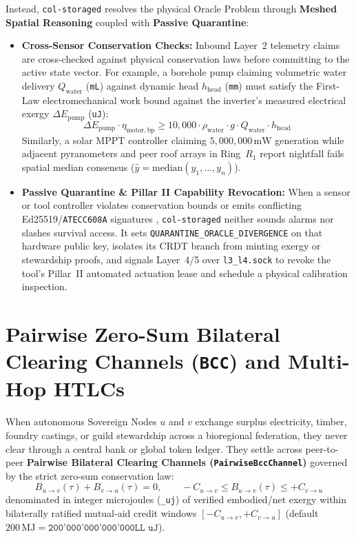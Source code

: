 Instead, \texttt{col-storaged} resolves the physical Oracle Problem through \textbf{Meshed Spatial Reasoning} coupled with \textbf{Passive Quarantine}:
\begin{itemize}
    \item \textbf{Cross-Sensor Conservation Checks:} Inbound Layer~2 telemetry claims are cross-checked against physical conservation laws before committing to the active state vector. For example, a borehole pump claiming volumetric water delivery $Q_{\mathrm{water}}$ (\texttt{mL}) against dynamic head $h_{\mathrm{head}}$ (\texttt{mm}) must satisfy the First-Law electromechanical work bound against the inverter's measured electrical exergy $\Delta E_{\mathrm{pump}}$ (\texttt{uJ}):
    \begin{equation}
    \Delta E_{\mathrm{pump}} \cdot \eta_{\mathrm{motor},\mathrm{bp}} \ge 10{,}000 \cdot \rho_{\mathrm{water}} \cdot g \cdot Q_{\mathrm{water}} \cdot h_{\mathrm{head}}
    \label{eq:ch9-pump-conservation}
    \end{equation}
    Similarly, a solar MPPT controller claiming $5{,}000{,}000\,\mathrm{mW}$ generation while adjacent pyranometers and peer roof arrays in Ring~$R_1$ report nightfall fails spatial median consensus ($\hat{y} = \mathrm{median}(y_1, \dots, y_n)$).
    \item \textbf{Passive Quarantine \& Pillar II Capability Revocation:} When a sensor or tool controller violates conservation bounds or emits conflicting Ed25519/\texttt{ATECC608A} signatures \parencite{bernstein2012high,microchip_atecc608a}, \texttt{col-storaged} neither sounds alarms nor slashes survival access. It sets \texttt{QUARANTINE\_ORACLE\_DIVERGENCE} on that hardware public key, isolates its CRDT branch from minting exergy or stewardship proofs, and signals Layer~4/5 over \texttt{l3\_l4.sock} to revoke the tool's Pillar~II automated actuation lease and schedule a physical calibration inspection.
\end{itemize}

\section{Pairwise Zero-Sum Bilateral Clearing Channels (\texttt{BCC}) and Multi-Hop HTLCs}
\label{sec:ch9-bcc-htlc}

When autonomous Sovereign Nodes $u$ and $v$ exchange surplus electricity, timber, foundry castings, or guild stewardship across a bioregional federation, they never clear through a central bank or global token ledger. They settle across peer-to-peer \textbf{Pairwise Bilateral Clearing Channels (\texttt{PairwiseBccChannel})} governed by the strict zero-sum conservation law:
\begin{equation}
B_{u \to v}(\tau) + B_{v \to u}(\tau) = 0, \qquad -C_{u \to v} \le B_{u \to v}(\tau) \le +C_{v \to u}
\label{eq:ch9-bcc-zero-sum}
\end{equation}
denominated in integer microjoules (\texttt{\_uj}) of verified embodied/net exergy within bilaterally ratified mutual-aid credit windows $[-C_{u \to v}, +C_{v \to u}]$ (default $200\,\mathrm{MJ} = \texttt{200'000'000'000'000LL uJ}$).

